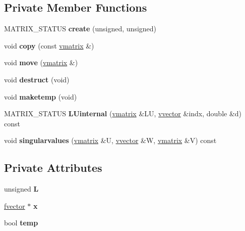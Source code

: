 \subsection*{Private Member Functions}
\begin{DoxyCompactItemize}
\item 
M\+A\+T\+R\+I\+X\+\_\+\+S\+T\+A\+T\+US {\bfseries create} (unsigned, unsigned)\hypertarget{classvmatrix_aff8e291fd90f7b58bc9bdeecd41e4e58}{}\label{classvmatrix_aff8e291fd90f7b58bc9bdeecd41e4e58}

\item 
void {\bfseries copy} (const \hyperlink{classvmatrix}{vmatrix} \&)\hypertarget{classvmatrix_ac02dee2b6d0b84fb1071797731ad4274}{}\label{classvmatrix_ac02dee2b6d0b84fb1071797731ad4274}

\item 
void {\bfseries move} (\hyperlink{classvmatrix}{vmatrix} \&)\hypertarget{classvmatrix_a1ddfcf0c2fb44e1c5dd1f4732f8ce93b}{}\label{classvmatrix_a1ddfcf0c2fb44e1c5dd1f4732f8ce93b}

\item 
void {\bfseries destruct} (void)\hypertarget{classvmatrix_a73718771160bb997a15ceee1a296b0db}{}\label{classvmatrix_a73718771160bb997a15ceee1a296b0db}

\item 
void {\bfseries maketemp} (void)\hypertarget{classvmatrix_aaebdf98641e63645f23483533f27f567}{}\label{classvmatrix_aaebdf98641e63645f23483533f27f567}

\item 
M\+A\+T\+R\+I\+X\+\_\+\+S\+T\+A\+T\+US {\bfseries L\+Uinternal} (\hyperlink{classvmatrix}{vmatrix} \&LU, \hyperlink{classvvector}{vvector} \&indx, double \&d) const \hypertarget{classvmatrix_a7455df5fc1d460a68b1e25e3d9605c87}{}\label{classvmatrix_a7455df5fc1d460a68b1e25e3d9605c87}

\item 
void {\bfseries singularvalues} (\hyperlink{classvmatrix}{vmatrix} \&U, \hyperlink{classvvector}{vvector} \&W, \hyperlink{classvmatrix}{vmatrix} \&V) const \hypertarget{classvmatrix_a23fe1deeaeac10b34a9d634e9bd79351}{}\label{classvmatrix_a23fe1deeaeac10b34a9d634e9bd79351}

\end{DoxyCompactItemize}
\subsection*{Private Attributes}
\begin{DoxyCompactItemize}
\item 
unsigned {\bfseries L}\hypertarget{classvmatrix_a47459477b1d2130e06a7a9cd795e1cd5}{}\label{classvmatrix_a47459477b1d2130e06a7a9cd795e1cd5}

\item 
\hyperlink{classfvector}{fvector} $\ast$ {\bfseries x}\hypertarget{classvmatrix_a496e222def34edb7cec840c199855bc5}{}\label{classvmatrix_a496e222def34edb7cec840c199855bc5}

\item 
bool {\bfseries temp}\hypertarget{classvmatrix_aee0112d16ea15b83b2f8dc8534a559c9}{}\label{classvmatrix_aee0112d16ea15b83b2f8dc8534a559c9}

\end{DoxyCompactItemize}
